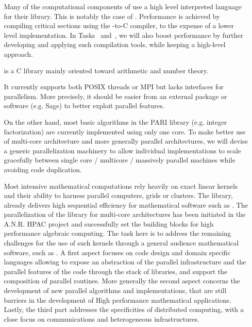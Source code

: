 \begin{workpackage}
\begin{wpdescription}
  Many of the computational components of \TheProject use a high level
  interpreted language for their library. This is notably the case of
  \Sage. Performance is achieved by compiling critical sections using
  the \Cython \Python-to-C compiler, to the expense of a lower level
  implementation. In Tasks~
  and~, we will also boost performance by
  further developing and applying such compilation tools, while
  keeping a high-level approach.

\end{wpdescription}
\begin{tasklist}
\begin{task}[title=PARI,id=hpc-pari]
  \Pari is a C library mainly oriented toward arithmetic and number theory.
  
  It currently supports both POSIX threads or MPI but lacks interfaces for
  parallelism. More precisely, it should be easier from an external package
  or software (e.g. Sage) to better exploit \Pari parallel features.

  On the other hand, most basic algorithms in the PARI library (e.g. integer
  factorization) are currently implemented using only one core. To
  make better use of multi-core architecture and more generally parallel
  architectures, we will devise a generic parallelization machinery
  to allow individual implementations to scale gracefully between single
  core / multicore / massively parallel machines while avoiding code
  duplication.
\end{task}

\begin{task}[title=GAP,id=hpc-gap]

\end{task}

\begin{task}[title=Linbox,id=hpc-linbox]
Most intensive mathematical computations rely heavily on exact linear kernels
and their ability to harness parallel computers, grids or clusters. The \Linbox
library, already delivers high sequential efficiency for mathematical software
such as \Sage. The parallelization of the library for multi-core architectures
has been initiated in the A.N.R. HPAC project and successfully set the building
blocks for high performance algebraic computing. 
The task here is to  address the remaining challenges for the use of such
kernels through a general audience mathematical software, such as \Sage.
A first aspect focuses on code design and domain specific languages allowing to
expose an abstraction of the parallel infrastructure and the parallel features
of the code through the stack of libraries, and support the
composition of parallel routines.  More generally the second aspect concerns the
development of new parallel algorithms and implementations, that are still
barriers in the development of High performance mathematical
applications. Lastly, the third part addresses the specificities of  distributed
computing, with a close focus on communications and heterogeneous infrastructures.


\end{task}
\end{tasklist}
\end{workpackage}
